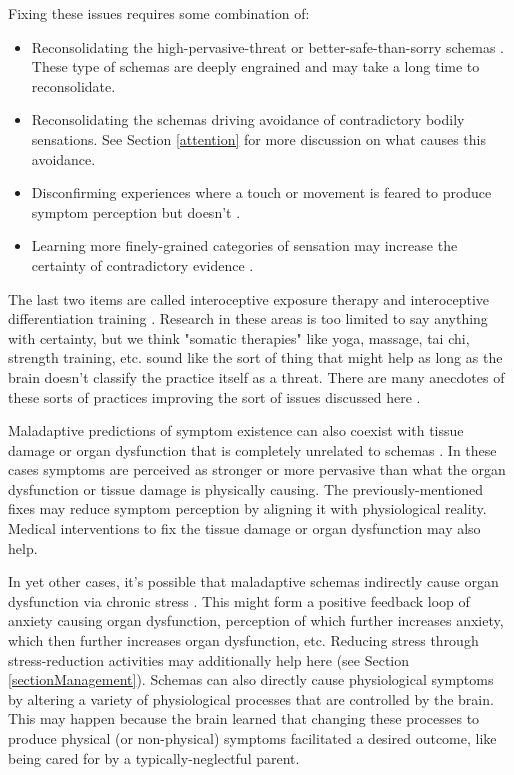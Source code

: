 \documentclass[12pt,letterpaper]{book}
\begin{document}
Fixing these issues requires some combination of:
\begin{itemize}
    \item Reconsolidating the high-pervasive-threat or better-safe-than-sorry schemas \cite{berghSelfEvidencing}. These type of schemas are deeply engrained and may take a long time to reconsolidate.
    \item Reconsolidating the schemas driving avoidance of contradictory bodily sensations. See Section \ref{attention} for more discussion on what causes this avoidance.
    \item Disconfirming experiences where a touch or movement is feared to produce symptom perception but doesn't \cite{berghPsychogenic}.
    \item Learning more finely-grained categories of sensation may increase the certainty of contradictory evidence \cite{berghPsychogenic}.
\end{itemize}
The last two items are called interoceptive exposure therapy and interoceptive differentiation training \cite{berghPsychogenic}. Research in these areas is too limited to say anything with certainty, but we think "somatic therapies" like yoga, massage, tai chi, strength training, etc. sound like the sort of thing that might help as long as the brain doesn't classify the practice itself as a threat. There are many anecdotes of these sorts of practices improving the sort of issues discussed here \cite{vanderKolkBody}.

Maladaptive predictions of symptom existence can also coexist with tissue damage or organ dysfunction that is completely unrelated to schemas \cite{berghPsychogenic}. In these cases symptoms are perceived as stronger or more pervasive than what the organ dysfunction or tissue damage is physically causing. The previously-mentioned fixes may reduce symptom perception by aligning it with physiological reality. Medical interventions to fix the tissue damage or organ dysfunction may also help.

In yet other cases, it's possible that maladaptive schemas indirectly cause organ dysfunction via chronic stress \cite{berghPsychogenic}. This might form a positive feedback loop of anxiety causing organ dysfunction, perception of which further increases anxiety, which then further increases organ dysfunction, etc. Reducing stress through stress-reduction activities may additionally help here (see Section \ref{sectionManagement}). Schemas can also directly cause physiological symptoms by altering a variety of physiological processes that are controlled by the brain. This may happen because the brain learned that changing these processes to produce physical (or non-physical) symptoms facilitated a desired outcome, like being cared for by a typically-neglectful parent.
\end{document}
